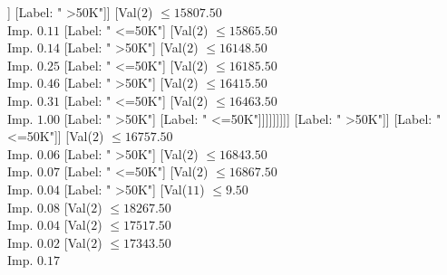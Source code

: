 \documentclass[margin=10pt]{standalone}
\begin{document}
\begin{forest}
																		[Val($2$) $ \leq 16554.50$ \\ Imp. $0.08$
																			[Val($2$) $ \leq 16474.50$ \\ Imp. $0.07$
																				[Val($2$) $ \leq 15435.50$ \\ Imp. $0.05$
																					[Label: " <=50K"]
																					[Val($2$) $ \leq 15752.50$ \\ Imp. $0.10$
																						[Val($2$) $ \leq 15625.50$ \\ Imp. $0.31$
																							[Val($2$) $ \leq 15610.50$ \\ Imp. $1.00$
																								[Label: " >50K"]
																								[Label: " <=50K"]]
																							[Label: " >50K"]]
																						[Val($2$) $ \leq 15807.50$ \\ Imp. $0.11$
																							[Label: " <=50K"]
																							[Val($2$) $ \leq 15865.50$ \\ Imp. $0.14$
																								[Label: " >50K"]
																								[Val($2$) $ \leq 16148.50$ \\ Imp. $0.25$
																									[Label: " <=50K"]
																									[Val($2$) $ \leq 16185.50$ \\ Imp. $0.46$
																										[Label: " >50K"]
																										[Val($2$) $ \leq 16415.50$ \\ Imp. $0.31$
																											[Label: " <=50K"]
																											[Val($2$) $ \leq 16463.50$ \\ Imp. $1.00$
																												[Label: " >50K"]
																												[Label: " <=50K"]]]]]]]]]
																				[Label: " >50K"]]
																			[Label: " <=50K"]]
																		[Val($2$) $ \leq 16757.50$ \\ Imp. $0.06$
																			[Label: " >50K"]
																			[Val($2$) $ \leq 16843.50$ \\ Imp. $0.07$
																				[Label: " <=50K"]
																				[Val($2$) $ \leq 16867.50$ \\ Imp. $0.04$
																					[Label: " >50K"]
																					[Val($11$) $ \leq 9.50$ \\ Imp. $0.08$
																						[Val($2$) $ \leq 18267.50$ \\ Imp. $0.04$
																							[Val($2$) $ \leq 17517.50$ \\ Imp. $0.02$
																								[Val($2$) $ \leq 17343.50$ \\ Imp. $0.17$

\end{forest}
\end{document}
